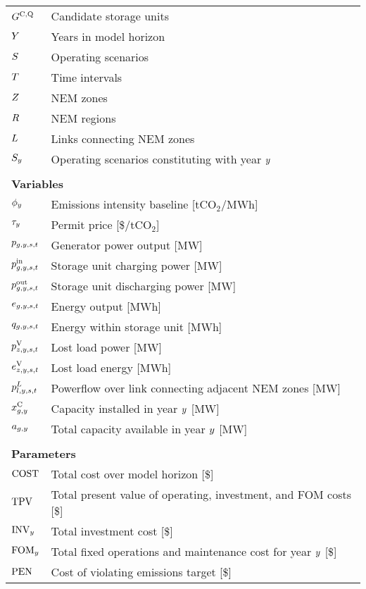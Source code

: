 \documentclass{article}
\begin{document}
\begin{longtable}{ p{}  p{}}
	$G^{\mathrm{C,Q}}$ & Candidate storage units\\
	$Y$ & Years in model horizon\\
	$S$ & Operating scenarios\\
	$T$ & Time intervals\\
	$Z$ & NEM zones\\
	$R$ & NEM regions\\
	$L$ & Links connecting NEM zones\\
	$S_{y}$ & Operating scenarios constituting with year $y$\\
	& \\
	\multicolumn{2}{l}{\textbf{Variables}}\\
	$\phi_{y}$ & Emissions intensity baseline [tCO$_{2}$/MWh]\\
	$\tau_{y}$ & Permit price [\$/tCO$_{2}$]\\
	$p_{g,y,s,t}$ & Generator power output [MW]\\
	$p^{\mathrm{in}}_{g,y,s,t}$ & Storage unit charging power [MW]\\
	$p^{\mathrm{out}}_{g,y,s,t}$ & Storage unit discharging power [MW]\\
	$e_{g,y,s,t}$ & Energy output [MWh]\\
	$q_{g,y,s,t}$ & Energy within storage unit [MWh]\\
	$p^{\mathrm{V}}_{z,y,s,t}$ & Lost load power [MW]\\
	$e^{\mathrm{V}}_{z,y,s,t}$ & Lost load energy [MWh]\\
	$p^{L}_{l,y,s,t}$ & Powerflow over link connecting adjacent NEM zones [MW]\\
	$x^{\mathrm{C}}_{g,y}$ & Capacity installed in year $y$ [MW]\\
	$a_{g,y}$ & Total capacity available in year $y$ [MW]\\
	& \\
	\multicolumn{2}{l}{\textbf{Parameters}}\\
	$\mathrm{COST}$ & Total cost over model horizon [\$]\\
	$\mathrm{TPV}_{}$ & Total present value of operating, investment, and FOM costs [\$]\\
	$\mathrm{INV}_{y}$ & Total investment cost [\$]\\
	$\mathrm{FOM}_{y}$ & Total fixed operations and maintenance cost for year $y$ [\$]\\
	$\mathrm{PEN}$ & Cost of violating emissions target [\$]\\

\end{longtable}
\end{document}

